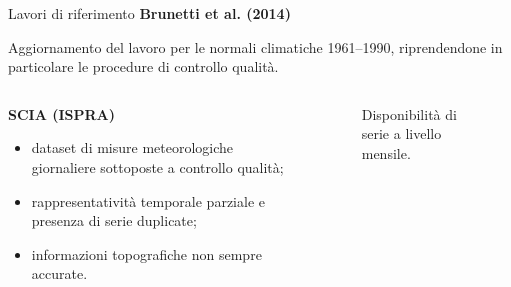 \begin{frame}[t]{Lavori di riferimento}
  \textbf{Brunetti et al. (2014)}

  Aggiornamento del lavoro per le normali climatiche 1961--1990, riprendendone in particolare le procedure di controllo qualità.

  \begin{columns}
    \begin{column}{0.55\textwidth}
      \textbf{SCIA (ISPRA)}
      \begin{itemize}
        \item dataset di misure meteorologiche giornaliere sottoposte a controllo qualità;
        \item rappresentatività temporale parziale e presenza di serie duplicate;
        \item informazioni topografiche non sempre accurate.
      \end{itemize}
    \end{column}
    \begin{column}{0.45\textwidth}
      \begin{figure}
        
        \caption*{\small Disponibilità di serie a livello mensile.}
      \end{figure}
    \end{column}
  \end{columns}

\end{frame}